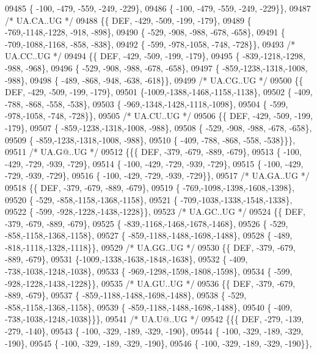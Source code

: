 \begin{DoxyCode}
09485 \{ -100, -479, -559, -249, -229\},
09486 \{ -100, -479, -559, -249, -229\}\},
09487 \textcolor{comment}{/* UA.CA..UG */}
09488 \{\{  DEF, -429, -509, -199, -179\},
09489 \{ -769,-1148,-1228, -918, -898\},
09490 \{ -529, -908, -988, -678, -658\},
09491 \{ -709,-1088,-1168, -858, -838\},
09492 \{ -599, -978,-1058, -748, -728\}\},
09493 \textcolor{comment}{/* UA.CC..UG */}
09494 \{\{  DEF, -429, -509, -199, -179\},
09495 \{ -839,-1218,-1298, -988, -968\},
09496 \{ -529, -908, -988, -678, -658\},
09497 \{ -859,-1238,-1318,-1008, -988\},
09498 \{ -489, -868, -948, -638, -618\}\},
09499 \textcolor{comment}{/* UA.CG..UG */}
09500 \{\{  DEF, -429, -509, -199, -179\},
09501 \{-1009,-1388,-1468,-1158,-1138\},
09502 \{ -409, -788, -868, -558, -538\},
09503 \{ -969,-1348,-1428,-1118,-1098\},
09504 \{ -599, -978,-1058, -748, -728\}\},
09505 \textcolor{comment}{/* UA.CU..UG */}
09506 \{\{  DEF, -429, -509, -199, -179\},
09507 \{ -859,-1238,-1318,-1008, -988\},
09508 \{ -529, -908, -988, -678, -658\},
09509 \{ -859,-1238,-1318,-1008, -988\},
09510 \{ -409, -788, -868, -558, -538\}\}\},
09511 \textcolor{comment}{/* UA.G@..UG */}
09512 \{\{\{  DEF, -379, -679, -889, -679\},
09513 \{ -100, -429, -729, -939, -729\},
09514 \{ -100, -429, -729, -939, -729\},
09515 \{ -100, -429, -729, -939, -729\},
09516 \{ -100, -429, -729, -939, -729\}\},
09517 \textcolor{comment}{/* UA.GA..UG */}
09518 \{\{  DEF, -379, -679, -889, -679\},
09519 \{ -769,-1098,-1398,-1608,-1398\},
09520 \{ -529, -858,-1158,-1368,-1158\},
09521 \{ -709,-1038,-1338,-1548,-1338\},
09522 \{ -599, -928,-1228,-1438,-1228\}\},
09523 \textcolor{comment}{/* UA.GC..UG */}
09524 \{\{  DEF, -379, -679, -889, -679\},
09525 \{ -839,-1168,-1468,-1678,-1468\},
09526 \{ -529, -858,-1158,-1368,-1158\},
09527 \{ -859,-1188,-1488,-1698,-1488\},
09528 \{ -489, -818,-1118,-1328,-1118\}\},
09529 \textcolor{comment}{/* UA.GG..UG */}
09530 \{\{  DEF, -379, -679, -889, -679\},
09531 \{-1009,-1338,-1638,-1848,-1638\},
09532 \{ -409, -738,-1038,-1248,-1038\},
09533 \{ -969,-1298,-1598,-1808,-1598\},
09534 \{ -599, -928,-1228,-1438,-1228\}\},
09535 \textcolor{comment}{/* UA.GU..UG */}
09536 \{\{  DEF, -379, -679, -889, -679\},
09537 \{ -859,-1188,-1488,-1698,-1488\},
09538 \{ -529, -858,-1158,-1368,-1158\},
09539 \{ -859,-1188,-1488,-1698,-1488\},
09540 \{ -409, -738,-1038,-1248,-1038\}\}\},
09541 \textcolor{comment}{/* UA.U@..UG */}
09542 \{\{\{  DEF, -279, -139, -279, -140\},
09543 \{ -100, -329, -189, -329, -190\},
09544 \{ -100, -329, -189, -329, -190\},
09545 \{ -100, -329, -189, -329, -190\},
09546 \{ -100, -329, -189, -329, -190\}\},

\end{DoxyCode}
